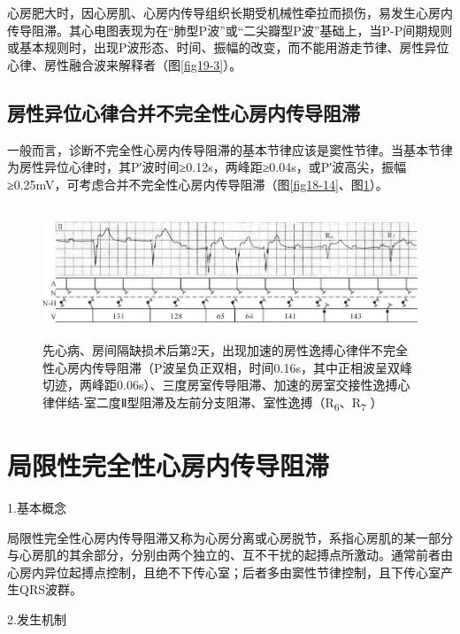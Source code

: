 心房肥大时，因心房肌、心房内传导组织长期受机械性牵拉而损伤，易发生心房内传导阻滞。其心电图表现为在“肺型P波”或“二尖瓣型P波”基础上，当P-P间期规则或基本规则时，出现P波形态、时间、振幅的改变，而不能用游走节律、房性异位心律、房性融合波来解释者（图\ref{fig19-3}）。

\protect\hypertarget{text00026.htmlux5cux23subid320}{}{}

\subsection{房性异位心律合并不完全性心房内传导阻滞}

一般而言，诊断不完全性心房内传导阻滞的基本节律应该是窦性节律。当基本节律为房性异位心律时，其P′波时间≥0.12s，两峰距≥0.04s，或P′波高尖，振幅≥0.25mV，可考虑合并不完全性心房内传导阻滞（图\ref{fig18-14}、图\ref{fig19-10}）。

\begin{figure}[!htbp]
 \centering
 \includegraphics[width=5.80208in,height=1.55208in]{./images/Image00326.jpg}
 \captionsetup{justification=centering}
 \caption{先心病、房间隔缺损术后第2天，出现加速的房性逸搏心律伴不完全性心房内传导阻滞（P波呈负正双相，时间0.16s，其中正相波呈双峰切迹，两峰距0.06s）、三度房室传导阻滞、加速的房室交接性逸搏心律伴结-室二度Ⅱ型阻滞及左前分支阻滞、室性逸搏（R\textsubscript{6}、R\textsubscript{7} ）}
 \label{fig19-10}
  \end{figure} 


\protect\hypertarget{text00026.htmlux5cux23subid321}{}{}

\section{局限性完全性心房内传导阻滞}

1.基本概念

局限性完全性心房内传导阻滞又称为心房分离或心房脱节，系指心房肌的某一部分与心房肌的其余部分，分别由两个独立的、互不干扰的起搏点所激动。通常前者由心房内异位起搏点控制，且绝不下传心室；后者多由窦性节律控制，且下传心室产生QRS波群。

2.发生机制

